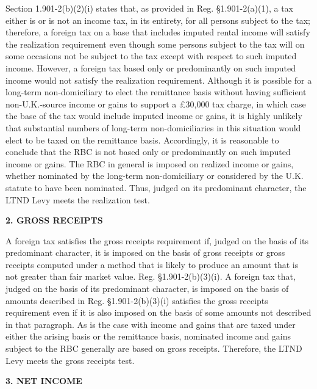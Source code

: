 \begin{select}
Section 1.901-2(b)(2)(i) states that, as provided in Reg. \S1.901-2(a)(1), a tax either is or is not an income tax, in its entirety, for all persons subject to the tax; therefore, a foreign tax on a base that includes imputed rental income will satisfy the realization requirement even though some persons subject to the tax will on some occasions not be subject to the tax except with respect to such imputed income. However, a foreign tax based only or predominantly on such imputed income would not satisfy the realization requirement. Although it is possible for a long-term non-domiciliary to elect the remittance basis without having sufficient non-U.K.-source income or gains to support a \pounds30,000 tax charge, in which case the base of the tax would include imputed income or gains, it is highly unlikely that substantial numbers of long-term non-domiciliaries in this situation would elect to be taxed on the remittance basis. Accordingly, it is reasonable to conclude that the RBC is not based only or predominantly on such imputed income or gains. The RBC in general is imposed on realized income or gains, whether nominated by the long-term non-domiciliary or considered by the U.K. statute to have been nominated. Thus, judged on its predominant character, the LTND Levy meets the realization test.

\begin{center}
\textbf{2. GROSS RECEIPTS}
\end{center}

A foreign tax satisfies the gross receipts requirement if, judged on the basis of its predominant character, it is imposed on the basis of gross receipts or gross receipts computed under a method that is likely to produce an amount that is not greater than fair market value. Reg. \S1.901-2(b)(3)(i). A foreign tax that, judged on the basis of its predominant character, is imposed on the basis of amounts described in Reg. \S1.901-2(b)(3)(i) satisfies the gross receipts requirement even if it is also imposed on the basis of some amounts not described in that paragraph. As is the case with income and gains that are taxed under either the arising basis or the remittance basis, nominated income and gains subject to the RBC generally are based on gross receipts. Therefore, the LTND Levy meets the gross receipts test.

\begin{center}
\textbf{3. NET INCOME}
\end{center}


\end{select}
